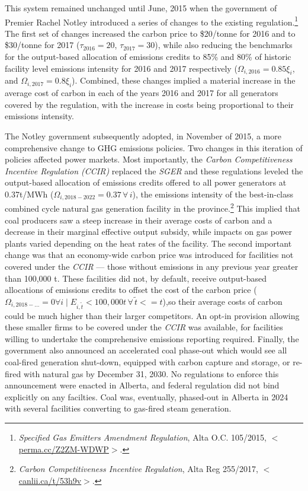 \documentclass[12pt]{article}
\newcommand{\coe}{\text{CO$_2$e}}
\begin{document}
This system remained unchanged until June, 2015 when the government of Premier Rachel Notley introduced a series of changes to the existing regulation.\footnote{\textit{Specified Gas Emitters Amendment Regulation}, Alta O.C. 105/2015, $<$\url{perma.cc/Z2ZM-WDWP}$>$.} The first set of changes increased the carbon price to \$20/tonne for 2016 and to \$30/tonne for 2017 ($\tau_{2016}=20$, $\tau_{2017}=30$), while also reducing the benchmarks for the output-based allocation of emissions credits to 85\% and 80\% of historic facility level emissions intensity for 2016 and 2017 respectively ($\Omega_{i,2016}=0.85\xi_i$, and $\Omega_{i,2017}=0.8\xi_i$). Combined, these changes implied a material increase in the average cost of carbon in each of the years 2016 and 2017 for all generators covered by the regulation, with the increase in costs being proportional to their emissions intensity. 

The Notley government subsequently adopted, in November of 2015, a more comprehensive change to GHG emissions policies. Two changes in this iteration of policies affected power markets. Most importantly, the \textit{Carbon Competitiveness Incentive Regulation (CCIR)} replaced the \emph{SGER} and these regulations leveled the output-based allocation of emissions credits offered to all power generators at 0.37t/MWh ($\Omega_{i,2018-2022}=0.37 \, \forall \, i$), the emissions intensity of the best-in-class combined cycle natural gas generation facility in the province.\footnote{\textit{Carbon Competitiveness Incentive Regulation}, Alta Reg 255/2017, $<$\url{canlii.ca/t/53h9v}$>$.} This implied that coal producers saw a steep increase in their average costs of carbon and a decrease in their marginal effective output subsidy, while impacts on gas power plants varied depending on the heat rates of the facility. The second important change was that an economy-wide carbon price was introduced for facilities not covered under the \emph{CCIR} --- those without emissions in any previous year greater than 100,000 t\coe. These facilities did not, by default, receive output-based allocations of emissions credits to offset the cost of the carbon price ($\Omega_{i,2018-...}=0  \forall i \mid E_{i,\tilde{t}} <100,000 t\, \forall\, \tilde{t} <=t$),so their average costs of carbon could be much higher than their larger competitors. An opt-in provision allowing these smaller firms to be covered under the \emph{CCIR} was available, for facilities willing to undertake the comprehensive emissions reporting required. Finally, the government also announced an accelerated coal phase-out which would see all coal-fired generation shut-down, equipped with carbon capture and storage, or re-fired with natural gas by December 31, 2030. No regulations to enforce this announcement were enacted in Alberta, and federal regulation did not bind explicitly on any facilties. Coal was, eventually, phased-out in Alberta in 2024 with several facilities converting to gas-fired steam generation.
\end{document}
